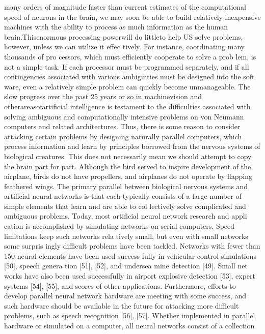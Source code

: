 \documentclass[11pt,a4paper,twocolumn]{article}
\begin{document}
many orders of magnitude faster than current estimates of 
the computational speed of neurons in the brain, we may 
soon be able to build relatively inexpensive machines with 
the ability to process as much information as the human 
brain.Thisenormous processing powerwill do littleto help 
US solve problems, however, unless we can utilize it effec
tively. For instance, coordinating many thousands of pro
cessors, which must efficiently cooperate to solve a prob
lem, is not a simple task. If each processor must be 
programmed separately, and if all contingencies associated 
with various ambiguities must be designed into the soft
ware, even a relatively simple problem can quickly become 
unmanageable. The slow progress over the past 25 years or 
so in machinevision and otherareasofartificial intelligence 
is testament to the difficulties associated with solving 
ambiguous and computationally intensive problems on von 
Neumann computers and related architectures. 
Thus, there is some reason to consider attacking certain 
problems by designing naturally parallel computers, which 
process information and learn by principles borrowed from 
the nervous systems of biological creatures. This does not 
necessarily mean we should attempt to copy the brain part 
for part. Although the bird served to inspire development 
of the airplane, birds do not have propellers, and airplanes 
do not operate by flapping feathered wings. The primary 
parallel between biological nervous systems and artificial 
neural networks is that each typically consists of a large 
number of simple elements that learn and are able to col
lectively solve complicated and ambiguous problems. 
Today, most artificial neural network research and appli
cation is accomplished by simulating networks on serial 
computers. Speed limitations keep such networks rela
tively small, but even with small networks some surpris
ingly difficult problems have been tackled. Networks with 
fewer than 150 neural elements have been used success
fully in vehicular control simulations [50], speech genera
tion [51], [52], and undersea mine detection [49]. Small net
works have also been used successfully in airport explosive 
detection [53], expert systems [54], [55], and scores of other 
applications. Furthermore, efforts to develop parallel neural 
network hardware are meeting with some success, and such 
hardware should be available in the future for attacking 
more difficult problems, such as speech recognition [56], 
[57]. 
Whether implemented in parallel hardware or simulated 
on a computer, all neural networks consist of a collection 
\end{document}
